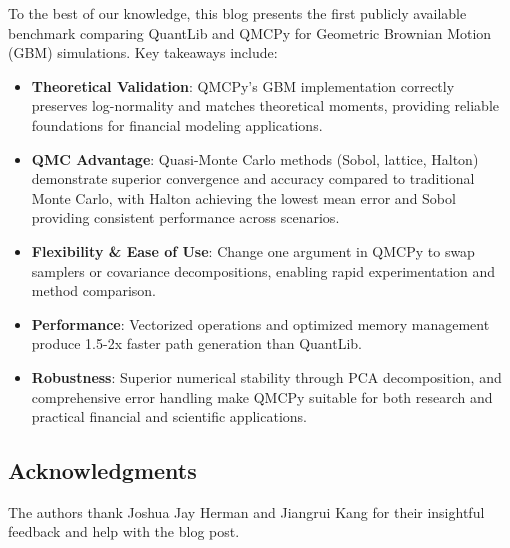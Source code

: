 \begin{tcolorbox}[title=Takeaways,colback=blue!1,colframe=blue!30!black]
To the best of our knowledge, this blog presents the first publicly available
benchmark comparing QuantLib and QMCPy for Geometric Brownian Motion (GBM)
simulations. Key takeaways include:
\begin{itemize}
    \item \textbf{Theoretical Validation}: QMCPy's GBM implementation correctly
    preserves log-normality and matches theoretical moments, providing reliable
    foundations for financial modeling applications.
    \item \textbf{QMC Advantage}: Quasi-Monte Carlo methods (Sobol, lattice,
    Halton) demonstrate superior convergence and accuracy compared to
    traditional Monte Carlo, with Halton achieving the lowest mean error and
    Sobol providing consistent performance across scenarios.
    \item \textbf{Flexibility \& Ease of Use}: Change one argument in QMCPy to
    swap samplers or covariance decompositions, enabling rapid experimentation
    and method comparison.
    \item \textbf{Performance}: Vectorized operations and optimized memory
    management produce 1.5-2x faster path generation than QuantLib.
    \item \textbf{Robustness}: Superior numerical stability through PCA
    decomposition, and comprehensive error handling make QMCPy suitable for both
    research and practical financial and scientific applications.
\end{itemize}
\end{tcolorbox}

\subsection*{Acknowledgments}
The authors thank Joshua Jay Herman and Jiangrui Kang for their insightful feedback and help with the blog post. 



